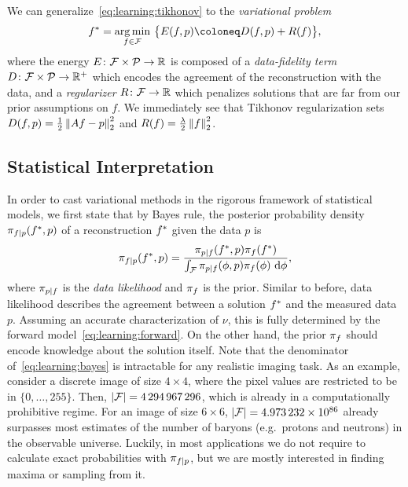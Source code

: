 \documentclass[../ml-ct.tex]{subfiles}
\begin{document}
We can generalize~\cref{eq:learning:tikhonov} to the \emph{variational problem}
\begin{equation}
	\optimal{f}{} = \argmin_{f \in \set{F}}\ \bigl\{ E(f, p) \coloneq D(f, p) + R(f) \bigr\},%
	\label{eq:learning:variational}
\end{equation}
where the energy \( E\colon\mathcal{F} \times \mathcal{P}\to\mathbb{R} \) is composed of a \emph{data-fidelity term} \( D\colon\mathcal{F} \times \mathcal{P}\to\mathbb{R}^+ \) which encodes the agreement of the reconstruction with the data, and a \emph{regularizer} \( R\colon\mathcal{F}\to\mathbb{R} \) which penalizes solutions that are far from our prior assumptions on \( f \).
We immediately see that Tikhonov regularization sets \( D(f, p) = \frac{1}{2} \left\lVert Af - p\right\rVert_2^2 \) and \( R(f) = \frac{\lambda}{2} \left\lVert f\right\rVert_2^2 \).
\subsection{Statistical Interpretation}
In order to cast variational methods in the rigorous framework of statistical models, we first state that by Bayes rule, the posterior probability density \( \pi_{f \mid p}(f^*_{\text{}}, p) \) of a reconstruction \( f^*_{\text{}} \) given the data \( p \) is
\begin{equation}
	\pdf{f \mid p}(\optimal{f}{}, p) = \frac{\pdf{p \mid f}(\optimal{f}{}, p)\pdf{f}(\optimal{f}{})}{\int_{\set{F}} \pdf{p \mid f}(\params, p) \pdf{f}(\params)\ \dd \params},%
	\label{eq:learning:bayes}
\end{equation}
where \( \pi_{p \mid f} \) is the \emph{data likelihood} and \( \pi_{f} \) is the prior.
Similar to before, data likelihood describes the agreement between a solution \( f^*_{\text{}} \) and the measured data \( p \).
Assuming an accurate characterization of \( \nu \), this is fully determined by the forward model~\cref{eq:learning:forward}.
On the other hand, the prior \( \pi_{f} \) should encode knowledge about the solution itself.
Note that the denominator of~\cref{eq:learning:bayes} is intractable for any realistic imaging task.
As an example, consider a discrete image of size \( \num{4} \times \num{4} \), where the pixel values are restricted to be in \(\{0,\dotsc,255\}\).
Then, \( |\mathcal{F}| = \num{4294967296}\), which is already in a computationally prohibitive regime.
For an image of size \( \num{6} \times \num{6} \), \( |\mathcal{F}| = \num{4.973232e+86} \) already surpasses most estimates of the number of baryons (e.g.\ protons and neutrons) in the observable universe.
Luckily, in most applications we do not require to calculate exact probabilities with \( \pi_{f \mid p} \), but we are mostly interested in finding maxima or sampling from it.
\end{document}

